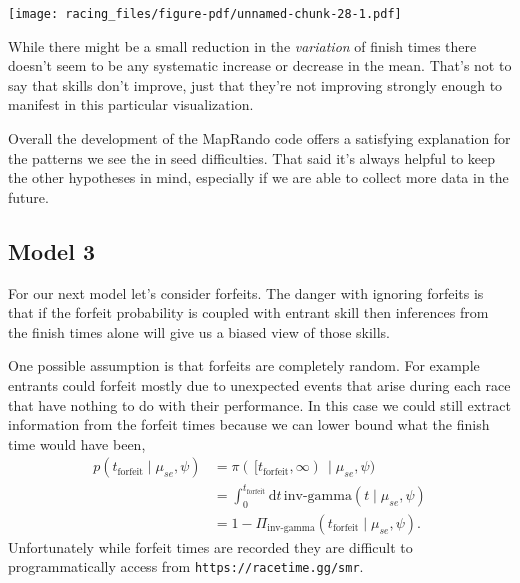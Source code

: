 \documentclass[
  letterpaper,
  DIV=11,
  numbers=noendperiod]{scrartcl}
\newenvironment{Shaded}{\begin{snugshade}}{\end{snugshade}}
\newcommand{\AttributeTok}[1]{\textcolor[rgb]{0.40,0.45,0.13}{#1}}
\newcommand{\DecValTok}[1]{\textcolor[rgb]{0.68,0.00,0.00}{#1}}
\newcommand{\FloatTok}[1]{\textcolor[rgb]{0.68,0.00,0.00}{#1}}
\newcommand{\FunctionTok}[1]{\textcolor[rgb]{0.28,0.35,0.67}{#1}}
\newcommand{\NormalTok}[1]{\textcolor[rgb]{0.00,0.23,0.31}{#1}}
\newcommand{\SpecialCharTok}[1]{\textcolor[rgb]{0.37,0.37,0.37}{#1}}
\newcommand{\StringTok}[1]{\textcolor[rgb]{0.13,0.47,0.30}{#1}}
\begin{document}
\begin{Shaded}
\end{Shaded}

\texttt{[image: racing\_files/figure-pdf/unnamed-chunk-28-1.pdf]}

While there might be a small reduction in the \emph{variation} of finish
times there doesn't seem to be any systematic increase or decrease in
the mean. That's not to say that skills don't improve, just that they're
not improving strongly enough to manifest in this particular
visualization.

Overall the development of the MapRando code offers a satisfying
explanation for the patterns we see the in seed difficulties. That said
it's always helpful to keep the other hypotheses in mind, especially if
we are able to collect more data in the future.

\subsection{Model 3}\label{model-3}

For our next model let's consider forfeits. The danger with ignoring
forfeits is that if the forfeit probability is coupled with entrant
skill then inferences from the finish times alone will give us a biased
view of those skills.

One possible assumption is that forfeits are completely random. For
example entrants could forfeit mostly due to unexpected events that
arise during each race that have nothing to do with their performance.
In this case we could still extract information from the forfeit times
because we can lower bound what the finish time would have been,
\begin{align*}
p(t_{\mathrm{forfeit}} \mid \mu_{se}, \psi)
&=
\pi( \, [ t_{\mathrm{forfeit}}, \infty ) \, \mid \mu_{se}, \psi)
\\
&=
\int_{0}^{t_{\mathrm{forfeit}}} \mathrm{d} t \,
\text{inv-gamma}(t \mid \mu_{se}, \psi)
\\
&=
1 - \Pi_{\text{inv-gamma}}(t_{\mathrm{forfeit}} \mid \mu_{se}, \psi).
\end{align*} Unfortunately while forfeit times are recorded they are
difficult to programmatically access from
\texttt{https://racetime.gg/smr}.
\end{document}
